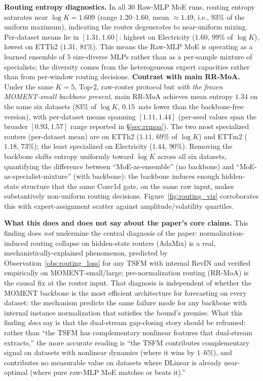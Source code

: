 \documentclass{article}
\begin{document}
\textbf{Routing entropy diagnostics.} In all $30$ Raw-MLP MoE runs, routing entropy saturates near $\log K = 1.609$ (range $1.20$--$1.60$, mean $\approx 1.49$, i.e., $93\%$ of the uniform maximum), indicating the router degenerates to near-uniform mixing. Per-dataset means lie in $[1.31, 1.60]$: highest on Electricity ($1.60$, $99\%$ of $\log K$), lowest on ETTh2 ($1.31$, $81\%$). This means the Raw-MLP MoE is operating as a learned ensemble of $5$ size-diverse MLPs rather than as a per-sample mixture of specialists; the diversity comes from the heterogeneous expert capacities rather than from per-window routing decisions. \textbf{Contrast with main RR-MoA.} Under the same $K{=}5$, Top-$2$, raw-router protocol but \emph{with the frozen MOMENT-small backbone present}, main RR-MoA achieves mean entropy $1.34$ on the same six datasets ($83\%$ of $\log K$, $0.15$~nats lower than the backbone-free version), with per-dataset means spanning $[1.11, 1.44]$ (per-seed values span the broader $[0.93, 1.57]$ range reported in \S\ref{sec:rrmoa}). The two most specialized routers (per-dataset mean) are on ETTh2 ($1.11$, $69\%$ of $\log K$) and ETTm2 ($1.18$, $73\%$); the least specialized on Electricity ($1.44$, $90\%$). Removing the backbone shifts entropy uniformly toward $\log K$ across all six datasets, quantifying the difference between ``MoE-as-ensemble'' (no backbone) and ``MoE-as-specialist-mixture'' (with backbone): the backbone induces enough hidden-state structure that the same Conv1d gate, on the same raw input, makes substantively non-uniform routing decisions. Figure~\ref{fig:routing_viz} corroborates this with expert-assignment scatter against amplitude/volatility quartiles.

\textbf{What this does and does not say about the paper's core claims.} This finding does \emph{not} undermine the central diagnosis of the paper: normalization-induced routing collapse on hidden-state routers (AdaMix) is a real, mechanistically-explained phenomenon, predicted by Observation~\ref{obs:routing_loss} for any TSFM with internal RevIN and verified empirically on MOMENT-small/large; pre-normalization routing (RR-MoA) is the causal fix at the router input. That diagnosis is independent of whether the MOMENT backbone is the most efficient architecture for forecasting on every dataset: the mechanism predicts the same failure mode for any backbone with internal instance normalization that satisfies the bound's premise. What this finding \emph{does} say is that the dual-stream gap-closing story should be reframed: rather than ``the TSFM has complementary nonlinear features that dual-stream extracts,'' the more accurate reading is ``the TSFM contributes complementary signal on datasets with nonlinear dynamics (where it wins by $1$--$6\%$), and contributes no measurable value on datasets where DLinear is already near-optimal (where pure raw-MLP MoE matches or beats it).''
\end{document}

